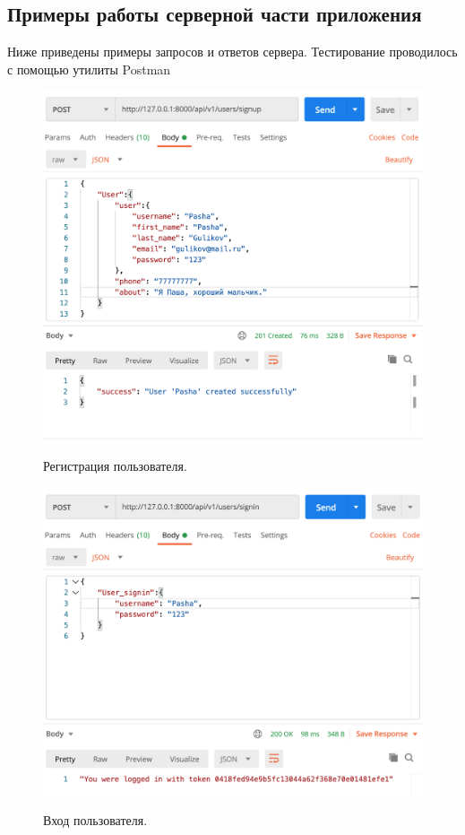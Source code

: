 \documentclass[a4paper,14pt]{extarticle}
\begin{document}
 	
 	\subsection{Примеры работы серверной части приложения}
 	
 	Ниже приведены примеры запросов и ответов сервера. Тестирование проводилось с помощью утилиты Postman ~\cite{postman}
 	
 	\begin{figure}[h!]
 		\begin{center}
 			{\includegraphics[scale = 0.5]{img/reg.png}}
 			\label{ris:reg}
 		\end{center}
 		\caption{Регистрация пользователя.}
 	\end{figure}
 
 	\newpage
 
 	\begin{figure}[h!]
 		\begin{center}
 			{\includegraphics[scale = 0.5]{img/login.png}}
 			\label{ris:login}
 		\end{center}
 		\caption{Вход пользователя.}
 	\end{figure}
 
\end{document}
